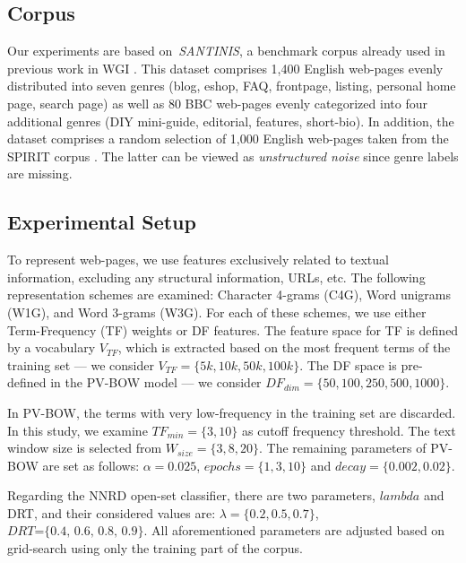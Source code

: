 \documentclass{llncs}
\begin{document}
\subsection{Corpus}\label{sec:corpora}
Our experiments are based on~\textit{SANTINIS}, a benchmark corpus already used in previous work in WGI \cite{mehler2010genres_on_web,pritsos2018open,santini2007automatic}. This dataset comprises 1,400 English web-pages evenly distributed into seven genres (blog, eshop, FAQ, frontpage, listing, personal home page, search page) as well as 80 BBC web-pages evenly categorized into four additional genres (DIY mini-guide, editorial, features, short-bio). In addition, the dataset comprises a random selection of 1,000 English web-pages taken from the SPIRIT corpus \cite{joho2004spirit}. The latter can be viewed as \emph{unstructured noise} since genre labels are missing. 

%
\subsection{Experimental Setup}\label{sec:evaluation_measures}
To represent web-pages, we use features exclusively related to textual information, excluding any structural information, URLs, etc. The following representation schemes are examined: Character 4-grams (C4G), Word unigrams (W1G), and Word 3-grams (W3G). For each of these schemes, we use either Term-Frequency (TF) weights or DF features. The feature space for TF is defined by a vocabulary $V_{TF}$, which is extracted based on the most frequent terms of the training set --- we consider $V_{TF}=\{5k,10k,50k,100k\}$. The DF space is pre-defined in the PV-BOW model --- we consider $DF_{dim}=\{50,100,250,500,1000\}$.

In PV-BOW, the terms with very low-frequency in the training set are discarded. In this study, we examine $TF_{min}=\{3,10\}$ as cutoff frequency threshold. The text window size is selected from $W_{size}=\{3,8,20\}$. The remaining parameters of PV-BOW are set as follows: $\alpha=0.025$, $epochs=\{1, 3, 10\}$ and $decay=\{0.002, 0.02\}$.

Regarding the NNRD open-set classifier, there are two parameters, $lambda$ and DRT, and their considered values are: $\lambda =\{0.2, 0.5, 0.7\}$, $DRT\textit{=\{0.4, 0.6, 0.8, 0.9\}}$. All aforementioned parameters are adjusted based on grid-search using only the training part of the corpus.
\end{document}
